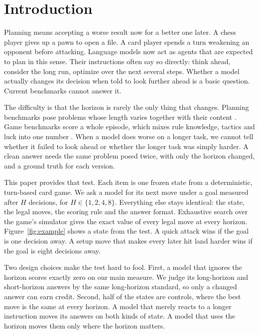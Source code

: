 \section{Introduction}

Planning means accepting a worse result now for a better one later. A chess player gives up a pawn to open a file. A card player spends a turn weakening an opponent before attacking. Language models now act as agents that are expected to plan in this sense. Their instructions often say so directly: think ahead, consider the long run, optimize over the next several steps. Whether a model actually changes its decision when told to look further ahead is a basic question. Current benchmarks cannot answer it.

The difficulty is that the horizon is rarely the only thing that changes. Planning benchmarks pose problems whose length varies together with their content \citep{valmeekam2023planbench,zheng2024naturalplan,xie2024travelplanner}. Game benchmarks score a whole episode, which mixes rule knowledge, tactics and luck into one number \citep{costarelli2024gamebench,paglieri2025balrog,park2025orak}. When a model does worse on a longer task, we cannot tell whether it failed to look ahead or whether the longer task was simply harder. A clean answer needs the same problem posed twice, with only the horizon changed, and a ground truth for each version.

This paper provides that test. Each item is one frozen state from a deterministic, turn-based card game. We ask a model for its next move under a goal measured after $H$ decisions, for $H \in \{1,2,4,8\}$. Everything else stays identical: the state, the legal moves, the scoring rule and the answer format. Exhaustive search over the game's simulator gives the exact value of every legal move at every horizon. Figure~\ref{fig:example} shows a state from the test. A quick attack wins if the goal is one decision away. A setup move that makes every later hit land harder wins if the goal is eight decisions away.

Two design choices make the test hard to fool. First, a model that ignores the horizon scores exactly zero on our main measure. We judge its long-horizon and short-horizon answers by the same long-horizon standard, so only a changed answer can earn credit. Second, half of the states are controls, where the best move is the same at every horizon. A model that merely reacts to a longer instruction moves its answers on both kinds of state. A model that uses the horizon moves them only where the horizon matters.

